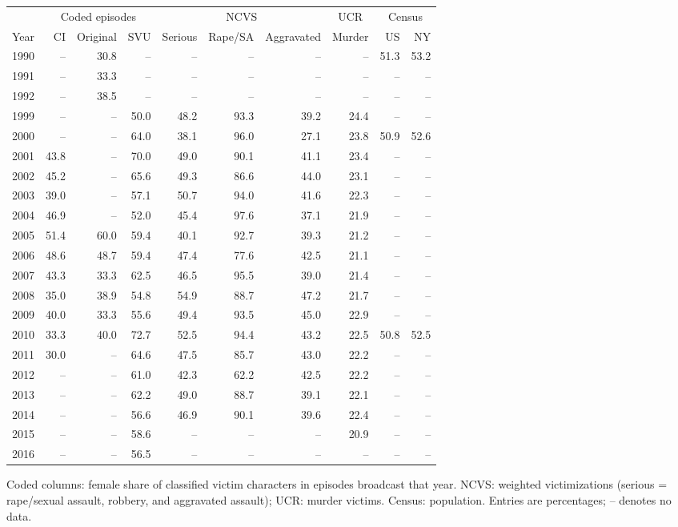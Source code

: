 \begin{center}
\label{tab:v_sex}
\small
\setlength{\tabcolsep}{3.5pt}
\renewcommand{\arraystretch}{1.08}
\begin{tabular}{@{}rrrrrrrrrr@{}}
\toprule
 & \multicolumn{3}{c}{Coded episodes} & \multicolumn{3}{c}{NCVS} & \multicolumn{1}{c}{UCR} & \multicolumn{2}{c}{Census} \\
\cmidrule(lr){2-4}
\cmidrule(lr){5-7}
\cmidrule(lr){8-8}
\cmidrule(lr){9-10}
Year & CI & Original & SVU & Serious & Rape/SA & Aggravated & Murder & US & NY \\
\midrule
1990 & -- & 30.8 & -- & -- & -- & -- & -- & 51.3 & 53.2 \\
1991 & -- & 33.3 & -- & -- & -- & -- & -- & -- & -- \\
1992 & -- & 38.5 & -- & -- & -- & -- & -- & -- & -- \\
1999 & -- & -- & 50.0 & 48.2 & 93.3 & 39.2 & 24.4 & -- & -- \\
2000 & -- & -- & 64.0 & 38.1 & 96.0 & 27.1 & 23.8 & 50.9 & 52.6 \\
2001 & 43.8 & -- & 70.0 & 49.0 & 90.1 & 41.1 & 23.4 & -- & -- \\
2002 & 45.2 & -- & 65.6 & 49.3 & 86.6 & 44.0 & 23.1 & -- & -- \\
2003 & 39.0 & -- & 57.1 & 50.7 & 94.0 & 41.6 & 22.3 & -- & -- \\
2004 & 46.9 & -- & 52.0 & 45.4 & 97.6 & 37.1 & 21.9 & -- & -- \\
2005 & 51.4 & 60.0 & 59.4 & 40.1 & 92.7 & 39.3 & 21.2 & -- & -- \\
2006 & 48.6 & 48.7 & 59.4 & 47.4 & 77.6 & 42.5 & 21.1 & -- & -- \\
2007 & 43.3 & 33.3 & 62.5 & 46.5 & 95.5 & 39.0 & 21.4 & -- & -- \\
2008 & 35.0 & 38.9 & 54.8 & 54.9 & 88.7 & 47.2 & 21.7 & -- & -- \\
2009 & 40.0 & 33.3 & 55.6 & 49.4 & 93.5 & 45.0 & 22.9 & -- & -- \\
2010 & 33.3 & 40.0 & 72.7 & 52.5 & 94.4 & 43.2 & 22.5 & 50.8 & 52.5 \\
2011 & 30.0 & -- & 64.6 & 47.5 & 85.7 & 43.0 & 22.2 & -- & -- \\
2012 & -- & -- & 61.0 & 42.3 & 62.2 & 42.5 & 22.2 & -- & -- \\
2013 & -- & -- & 62.2 & 49.0 & 88.7 & 39.1 & 22.1 & -- & -- \\
2014 & -- & -- & 56.6 & 46.9 & 90.1 & 39.6 & 22.4 & -- & -- \\
2015 & -- & -- & 58.6 & -- & -- & -- & 20.9 & -- & -- \\
2016 & -- & -- & 56.5 & -- & -- & -- & -- & -- & -- \\
\bottomrule
\end{tabular}
\par\smallskip
\parbox{\linewidth}{\footnotesize Coded columns: female share of classified victim characters in episodes broadcast that year. NCVS: weighted victimizations (serious = rape/sexual assault, robbery, and aggravated assault); UCR: murder victims. Census: population.  Entries are percentages; -- denotes no data.}
\end{center}
